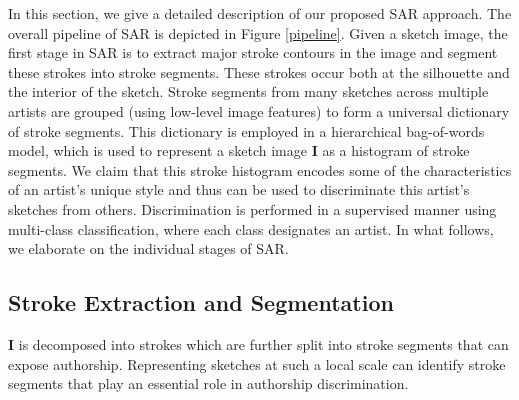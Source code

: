 In this section, we give a detailed description of our proposed SAR approach. The overall pipeline of SAR is depicted in Figure \ref{pipeline}. Given a sketch image, the first stage in SAR is to extract major stroke contours in the image and segment these strokes into stroke segments. These strokes occur both at the silhouette and the interior of the sketch. Stroke segments from many sketches across multiple artists are grouped (using low-level image features) to form a universal dictionary of stroke segments. This dictionary is employed in a hierarchical bag-of-words model, which is used to represent a sketch image $\mathbf{I}$ as a histogram of stroke segments. We claim that this stroke histogram encodes some of the characteristics of an artist's unique style and thus can be used to discriminate this artist's sketches from others. Discrimination is performed in a supervised manner using multi-class classification, where each class designates an artist. In what follows, we elaborate on the individual stages of SAR.
\vspace{-4mm}
\subsection{Stroke Extraction and Segmentation}\label{subsec: segmentation}
\vspace{-1mm}
 $\mathbf{I}$ is decomposed into strokes which are further split into stroke segments that can expose authorship. Representing sketches at such a local scale can identify stroke segments that play an essential role in authorship discrimination.

